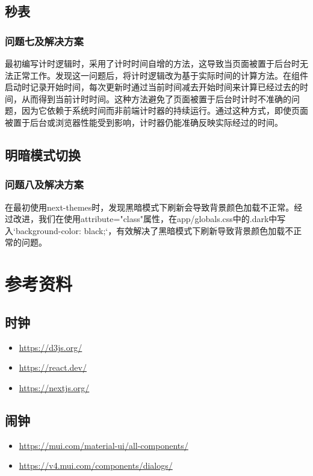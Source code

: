 \documentclass[a4paper,11pt]{article}
\begin{document}
\subsection{秒表}

\subsubsection{问题七及解决方案}

最初编写计时逻辑时，采用了计时时间自增的方法，这导致当页面被置于后台时无法正常工作。发现这一问题后，将计时逻辑改为基于实际时间的计算方法。在组件启动时记录开始时间，每次更新时通过当前时间减去开始时间来计算已经过去的时间，从而得到当前计时时间。这种方法避免了页面被置于后台时计时不准确的问题，因为它依赖于系统时间而非前端计时器的持续运行。通过这种方式，即使页面被置于后台或浏览器性能受到影响，计时器仍能准确反映实际经过的时间。

\subsection{明暗模式切换}

\subsubsection{问题八及解决方案}

在最初使用next-themes时，发现黑暗模式下刷新会导致背景颜色加载不正常。经过改进，我们在使用attribute="class"属性，在app/globals.css中的.dark中写入`background-color: black;`，有效解决了黑暗模式下刷新导致背景颜色加载不正常的问题。

\section{参考资料}

\subsection{时钟}
\begin{itemize}
    \item \url{https://d3js.org/}
    \item \url{https://react.dev/}
    \item \url{https://nextjs.org/}
\end{itemize}

\subsection{闹钟}
\begin{itemize}
    \item \url{https://mui.com/material-ui/all-components/}
    \item \url{https://v4.mui.com/components/dialogs/}
\end{itemize}
\end{document}
